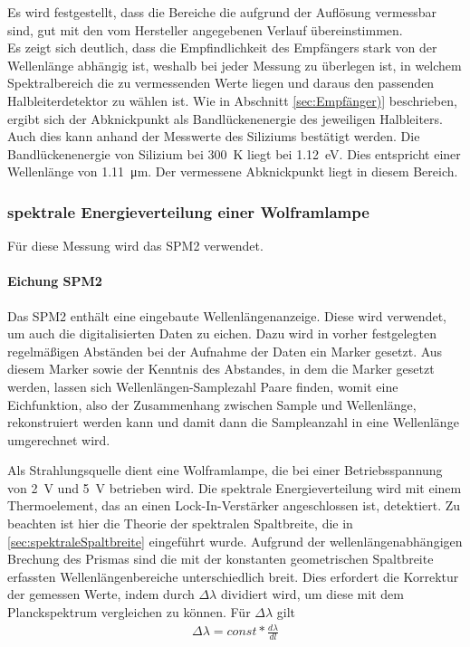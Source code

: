 \documentclass[a4paper,twoside,final]{article}
\begin{document}
\FloatBarrier

Es wird festgestellt, dass die Bereiche die aufgrund der Auflösung vermessbar sind, gut mit den vom Hersteller angegebenen Verlauf übereinstimmen. \\
Es zeigt sich deutlich, dass die Empfindlichkeit des Empfängers stark von der Wellenlänge abhängig ist, weshalb bei jeder Messung zu überlegen ist, in welchem Spektralbereich die zu vermessenden Werte liegen und daraus den passenden Halbleiterdetektor zu wählen ist. Wie in Abschnitt \ref{sec:Empfänger)} beschrieben, ergibt sich der Abknickpunkt als Bandlückenenergie des jeweiligen Halbleiters. Auch dies kann anhand der Messwerte des Siliziums bestätigt werden. Die Bandlückenenergie von Silizium bei \SI{300}{\kelvin} liegt bei \SI{1.12}{\electronvolt}. Dies entspricht einer Wellenlänge von \SI{1.11}{\micro\meter}. Der vermessene Abknickpunkt liegt in diesem Bereich.

\subsubsection{spektrale Energieverteilung einer Wolframlampe}
Für diese Messung wird das SPM2 verwendet.
\paragraph{Eichung SPM2}\label{par:EichungSPM2} Das SPM2 enthält eine eingebaute Wellenlängenanzeige. Diese wird verwendet, um auch die digitalisierten Daten zu eichen. Dazu wird in vorher festgelegten regelmäßigen Abständen bei der Aufnahme der Daten ein Marker gesetzt. Aus diesem Marker sowie der Kenntnis des Abstandes, in dem die Marker gesetzt werden, lassen sich Wellenlängen-Samplezahl Paare finden, womit eine Eichfunktion, also der Zusammenhang zwischen Sample und Wellenlänge, rekonstruiert werden kann und damit dann die Sampleanzahl in eine Wellenlänge umgerechnet wird.

Als Strahlungsquelle dient eine Wolframlampe, die bei einer Betriebsspannung von \SI{2}{V} und \SI{5}{V} betrieben wird. Die spektrale Energieverteilung wird mit einem Thermoelement, das an einen Lock-In-Verstärker angeschlossen ist, detektiert. Zu beachten ist hier die Theorie der spektralen Spaltbreite, die in \ref{sec:spektraleSpaltbreite} eingeführt wurde. Aufgrund der wellenlängenabhängigen Brechung des Prismas sind die mit der konstanten geometrischen Spaltbreite erfassten Wellenlängenbereiche unterschiedlich breit. Dies erfordert die Korrektur der gemessen Werte, indem durch $\Delta \lambda$ dividiert wird, um diese mit dem Planckspektrum vergleichen zu können. Für $\Delta \lambda$ gilt
\begin{align}
  \Delta \lambda = const* \frac{d\lambda}{dl}
\end{align}
\end{document}
